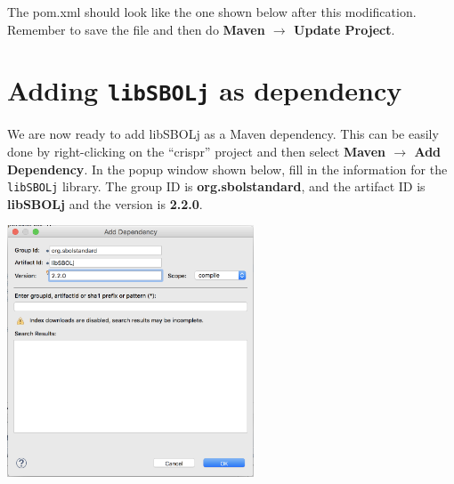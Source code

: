 The pom.xml should look like the one shown below after this modification. Remember to save the file and then do {\bf Maven $\rightarrow$  Update Project}.

\begin{minipage}{\textwidth} 

\end{minipage}

\section*{Adding {\tt libSBOLj} as dependency}
We are now ready to add libSBOLj as a Maven dependency. This can be easily done by right-clicking on the ``crispr'' project and then select {\bf Maven $\rightarrow$ Add Dependency}.
In the popup window shown below, fill in the information for the {\tt libSBOLj} library. The group ID is {\bf org.sbolstandard}, and the artifact ID is {\bf libSBOLj} and the version is {\bf 2.2.0}. 
\begin{center}
  \includegraphics[width=0.55\textwidth]{figures/addMavenDependency2}
\end{center}

